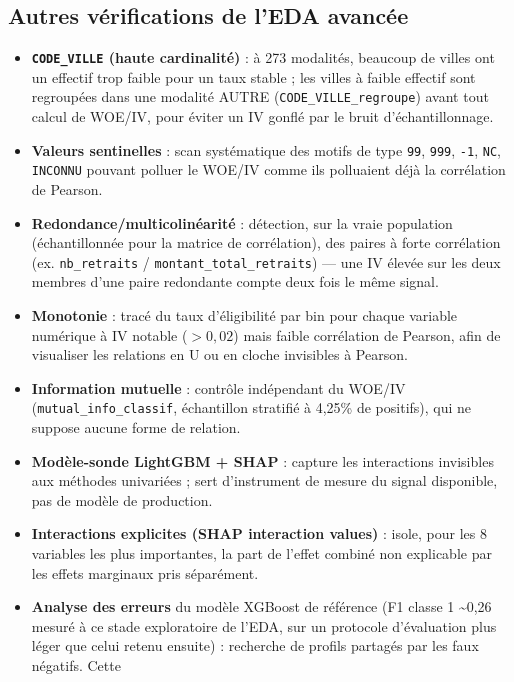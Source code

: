 \documentclass[11pt,a4paper]{report}
\begin{document}
\subsection{Autres vérifications de l'EDA avancée}
\begin{itemize}
  \item \textbf{\texttt{CODE\_VILLE} (haute cardinalité)} : à 273
  modalités, beaucoup de villes ont un effectif trop faible pour un taux
  stable ; les villes à faible effectif sont regroupées dans une modalité
  \og AUTRE \fg{} (\texttt{CODE\_VILLE\_regroupe}) avant tout calcul de
  WOE/IV, pour éviter un IV gonflé par le bruit d'échantillonnage.
  \item \textbf{Valeurs sentinelles} : scan systématique des motifs de
  type \texttt{99}, \texttt{999}, \texttt{-1}, \texttt{NC},
  \texttt{INCONNU} pouvant polluer le WOE/IV comme ils polluaient déjà la
  corrélation de Pearson.
  \item \textbf{Redondance/multicolinéarité} : détection, sur la vraie
  population (échantillonnée pour la matrice de corrélation), des paires
  à forte corrélation (ex. \texttt{nb\_retraits} / \texttt{montant\_total\_retraits}) —
  une IV élevée sur les deux membres d'une paire redondante compte deux
  fois le même signal.
  \item \textbf{Monotonie} : tracé du taux d'éligibilité par bin pour
  chaque variable numérique à IV notable ($>0,02$) mais faible
  corrélation de Pearson, afin de visualiser les relations en U ou en
  cloche invisibles à Pearson.
  \item \textbf{Information mutuelle} : contrôle indépendant du WOE/IV
  (\texttt{mutual\_info\_classif}, échantillon stratifié à 4,25\% de
  positifs), qui ne suppose aucune forme de relation.
  \item \textbf{Modèle-sonde LightGBM + SHAP} : capture les interactions
  invisibles aux méthodes univariées ; sert d'instrument de mesure du
  signal disponible, pas de modèle de production.
  \item \textbf{Interactions explicites (SHAP interaction values)} :
  isole, pour les 8 variables les plus importantes, la part de l'effet
  combiné non explicable par les effets marginaux pris séparément.
  \item \textbf{Analyse des erreurs} du modèle XGBoost de référence
  (F1 classe 1 \textasciitilde 0,26 mesuré à ce stade exploratoire de
  l'EDA, sur un protocole d'évaluation plus léger que celui retenu
  ensuite) : recherche de profils partagés par les faux négatifs. Cette

\end{itemize}
\end{document}
